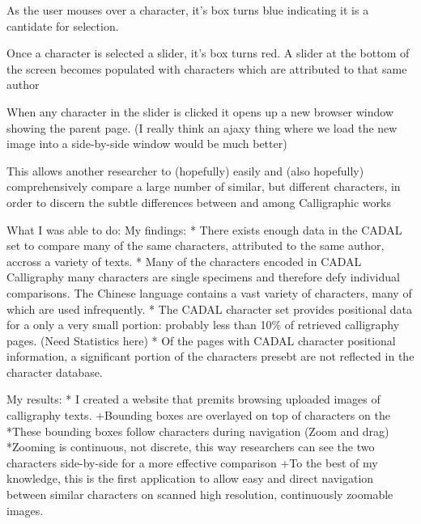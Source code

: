                 As the user mouses over a character, it's box turns blue indicating it is a cantidate for selection.
                
                Once a character is selected a slider, it's box turns red. A slider at the bottom of the screen becomes populated with characters which are attributed to that same author
                
                When any character in the slider is clicked it opens up a new browser window showing the parent page.  (I really think an ajaxy thing where we load the new image into a side-by-side window would be much better)
                
                This allows another researcher to (hopefully) easily and (also hopefully) comprehensively compare a large number of similar, but different characters, in order to discern the subtle differences between and among Calligraphic works
                
                
















What I was able to do:
    My findings:
        * There exists enough data in the CADAL set to compare many of the same characters, attributed to the same author, accross a variety of texts.
        *  Many of the characters encoded in CADAL Calligraphy many characters are single specimens and therefore defy individual comparisons.  The Chinese language contains a vast variety of characters, many of which are used infrequently.
        *  The CADAL character set provides positional data for a only a very small portion: probably less than 10\% of retrieved calligraphy pages.  (Need Statistics here)
        *  Of the pages with CADAL character positional information, a significant portion of the characters presebt are not reflected in the character database.
    
    My results:
        *  I created a website that premits browsing uploaded images of calligraphy texts.
            +Bounding boxes are overlayed on top of characters on the 
                *These bounding boxes follow characters during navigation (Zoom and drag)
                *Zooming is continuous, not discrete, this way researchers can see the two characters side-by-side for a more effective comparison
            +To the best of my knowledge, this is the first application to allow easy and direct navigation between similar characters on scanned high resolution, continuously zoomable images.

